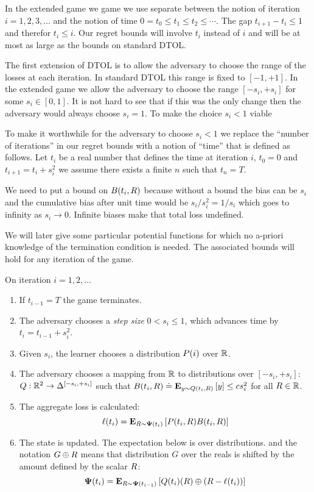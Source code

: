 \documentclass[12pt]{article} %
\begin{document}
In the extended game we game we use separate between the notion of
iteration $i=1,2,3,\ldots$ and the notion of time $0=t_0 \leq t_1 \leq
t_2 \leq \cdots$. The gap $t_{i+1}-t_i \leq 1$ and therefor $t_i\leq
i$. Our regret bounds will involve $t_i$ instead of $i$ and will
be at most as large as the bounds on standard DTOL. 

The first extension of DTOL is to allow the adversary to choose the
range of the losses at each iteration. In standard DTOL this range is fixed to
$[-1,+1]$. In the extended game we allow the adversary to choose the
range $[-s_i,+s_i]$ for some $s_i \in [0,1]$. It is not hard to see
that if this was the only change then the adversary would always
choose $s_i=1$. To make the choice $s_i<1$ viable


To make it worthwhile for the adversary to choose $s_i<1$
we replace the ``number of iterations'' in our regret bounds with a
notion of ``time'' that is defined as follows. Let $t_i$ be a real
number that defines the time at iteration $i$, $t_0=0$ and
$t_{i+1} = t_i + s_i^2$
we assume there exists a finite $n$ such that $t_n = T$.

We need to put a bound on $B(t_i,R)$ because without a bound the
bias can be $s_i$ and the cumulative  bias after unit time would be
$s_i/s_i^2 = 1/s_i$ which goes to infinity as $s_i \to 0$. Infinite
biases make that total loss undefined. 

We will later give some particular potential functions for which no
a-priori knowledge of the termination condition is needed. The
associated bounds will hold for any iteration of the game.
\vspace{1cm}

On iteration $i=1,2,\ldots$
\begin{enumerate}
\item  If $t_{i-1}=T$ the game terminates.
\item The adversary chooses a {\em step size} $0<s_i\leq 1$, which advances
  time by $t_i = t_{i-1}+s_i^2$.
\item Given $s_i$, the learner chooses a distribution $P(i)$ over $\mathbb{R}$.
\item The adversary chooses a mapping from $\mathbb{R}$ to distributions
  over $[-s_i,+s_i]$: $Q:\mathbb{R}^2 \to \Delta^{[-s_i,+s_i]}$ \newline
  such that $B(t_i,R) \doteq {\bf E}_{y \sim Q(t_i,R)}\left[ y \right] \leq
  c s_i^2$
  for all $R \in \mathbb{R}$.
\item The aggregate loss is calculated:
  \begin{equation} \label{eqn:ell-discrete}
    \ell(t_i)={\bf E}_{R \sim {\bf \Psi}(t_i)}\left[ P(t_i,R)
      B(t_i,R) \right]
  \end{equation}
\item The state is updated. The expectation below is over
  distributions. and the notation $G \oplus R$ means
  that distribution $G$ over the reals is shifted by the amount
  defined by the scalar $R$:
  $${\bf \Psi}(t_i) = {\bf E}_{R \sim {\bf \Psi}(t_{i-1})}\left[ Q(t_i)(R)\oplus (R-\ell(t_i)) \right]
  $$
\end{enumerate}
\end{document}
